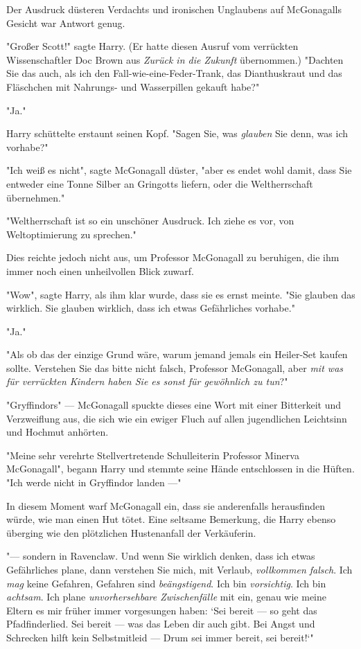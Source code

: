 {Der Ausdruck düsteren Verdachts und ironischen Unglaubens auf McGonagalls Gesicht war Antwort genug.

"Großer Scott!" sagte Harry. (Er hatte diesen Ausruf vom verrückten Wissenschaftler Doc Brown aus \emph{Zurück in die Zukunft} übernommen.) "Dachten Sie das auch, als ich den Fall-wie-eine-Feder-Trank, das Dianthuskraut und das Fläschchen mit Nahrungs- und Wasserpillen gekauft habe?"

"Ja."

Harry schüttelte erstaunt seinen Kopf. "Sagen Sie, was \emph{glauben} Sie denn, was ich vorhabe?"

"Ich weiß es nicht", sagte McGonagall düster, "aber es endet wohl damit, dass Sie entweder eine Tonne Silber an Gringotts liefern, oder die Weltherrschaft übernehmen."

"Weltherrschaft ist so ein unschöner Ausdruck. Ich ziehe es vor, von Weltoptimierung zu sprechen."

Dies reichte jedoch nicht aus, um Professor McGonagall zu beruhigen, die ihm immer noch einen unheilvollen Blick zuwarf.

"Wow", sagte Harry, als ihm klar wurde, dass sie es ernst meinte. "Sie glauben das wirklich. Sie glauben wirklich, dass ich etwas Gefährliches vorhabe."

"Ja."

"Als ob das der einzige Grund wäre, warum jemand jemals ein Heiler-Set kaufen sollte. Verstehen Sie das bitte nicht falsch, Professor McGonagall, aber \emph{mit was für verrückten Kindern haben Sie es sonst für gewöhnlich zu tun}?"

"Gryffindors" --- McGonagall spuckte dieses eine Wort mit einer Bitterkeit und Verzweiflung aus, die sich wie ein ewiger Fluch auf allen jugendlichen Leichtsinn und Hochmut anhörten.

"Meine sehr verehrte Stellvertretende Schulleiterin Professor Minerva McGonagall", begann Harry und stemmte seine Hände entschlossen in die Hüften. "Ich werde nicht in Gryffindor landen ---"

In diesem Moment warf McGonagall ein, dass sie anderenfalls herausfinden würde, wie man einen Hut tötet. Eine seltsame Bemerkung, die Harry ebenso überging wie den plötzlichen Hustenanfall der Verkäuferin.

"--- sondern in Ravenclaw. Und wenn Sie wirklich denken, dass ich etwas Gefährliches plane, dann verstehen Sie mich, mit Verlaub, \emph{vollkommen falsch}. Ich \emph{mag} keine Gefahren, Gefahren sind \emph{beängstigend}. Ich bin \emph{vorsichtig}. Ich bin \emph{achtsam}. Ich plane \emph{unvorhersehbare Zwischenfälle} mit ein, genau wie meine Eltern es mir früher immer vorgesungen haben: `Sei bereit --- so geht das Pfadfinderlied. Sei bereit --- was das Leben dir auch gibt. Bei Angst und Schrecken hilft kein Selbstmitleid --- Drum sei immer bereit, sei bereit!`"

}
